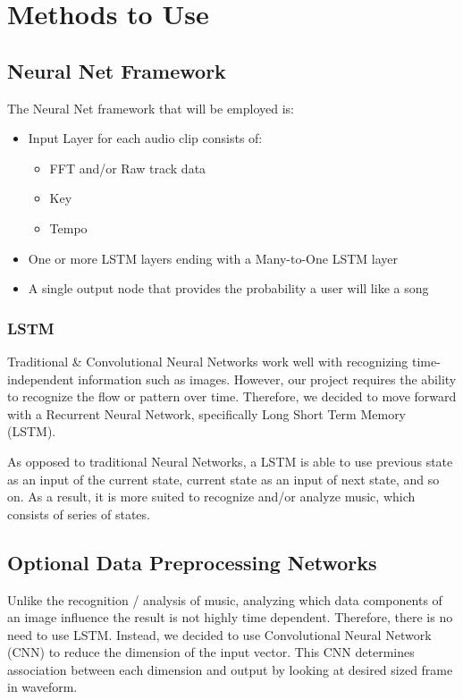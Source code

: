 \documentclass[10pt]{article}
\begin{document}
\section{Methods to Use}
\subsection{Neural Net Framework}
The Neural Net framework that will be employed is:
\begin{itemize}
	\setlength{\itemsep}{1pt}
	\setlength{\parskip}{0pt}
	\setlength{\parsep}{0pt}
    \item Input Layer for each audio clip consists of:
    	\begin{itemize}
    		\item FFT and/or Raw track data
            \item Key
            \item Tempo
    	\end{itemize}
    \item One or more LSTM layers ending with a Many-to-One LSTM layer
    \item A single output node that provides the probability a user will like a song 
\end{itemize}

\newpage
\subsubsection{LSTM}
Traditional \& Convolutional Neural Networks work well with recognizing time-independent information such as images. However, our project requires the ability to recognize the flow or pattern over time. Therefore, we decided to move forward with a Recurrent Neural Network, specifically Long Short Term Memory (LSTM).

As opposed to traditional Neural Networks, a LSTM is able to use previous state as an input of the current state, current state as an input of next state, and so on. As a result, it is more suited to recognize and/or analyze music, which consists of series of states.

\subsection{Optional Data Preprocessing Networks}
Unlike the recognition / analysis of music, analyzing which data components of an image influence the result is not highly time dependent. Therefore, there is no need to use LSTM. Instead, we decided to use Convolutional Neural Network (CNN) to reduce the dimension of the input vector. This CNN determines association between each dimension and output by looking at desired sized frame in waveform.
\end{document}
